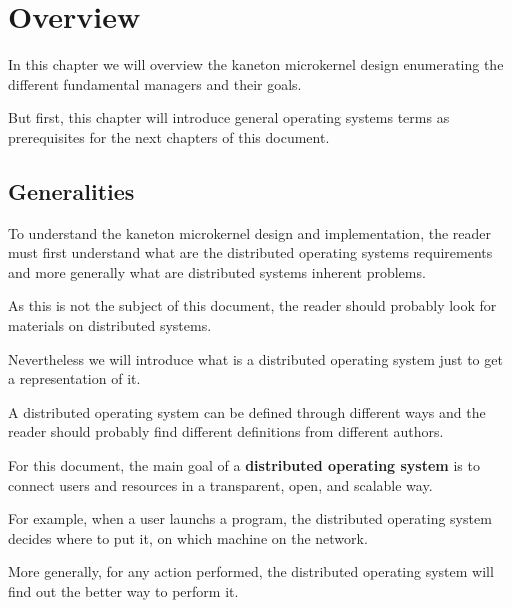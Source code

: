 %
%
%
%
%
%

%
%

\chapter{Overview}

In this chapter we will overview the kaneton microkernel design enumerating
the different fundamental managers and their goals.

But first, this chapter will introduce general operating systems
terms as prerequisites for the next chapters of this document.

\newpage

%
%

\section{Generalities}

To understand the kaneton microkernel design and implementation, the reader
must first understand what are the distributed operating systems requirements
and more generally what are distributed systems inherent problems.

As this is not the subject of this document, the reader should probably
look for materials on distributed systems.

Nevertheless we will introduce what is a distributed operating system
just to get a representation of it.

A distributed operating system can be defined through different ways and
the reader should probably find different definitions from different
authors.

For this document, the main goal of a \textbf{distributed operating system}
is to connect users and resources in a transparent, open, and scalable way.

For example, when a user launchs a program, the distributed operating system
decides where to put it, on which machine on the network.

More generally, for any action performed, the distributed operating system
will find out the better way to perform it.

